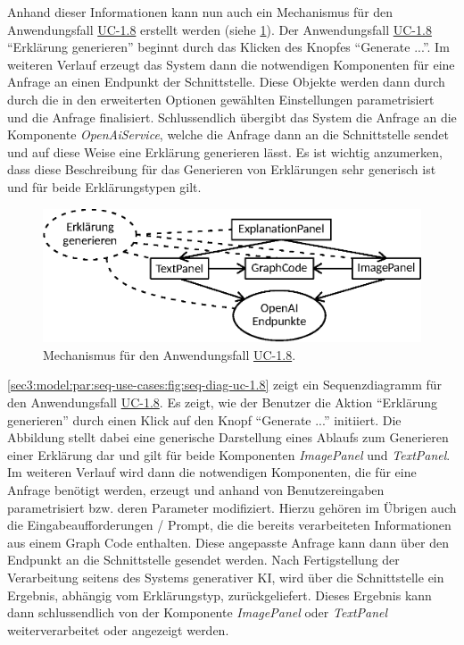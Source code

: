 Anhand dieser Informationen kann nun auch ein Mechanismus für den Anwendungsfall \hyperref[sec3:model:uc-1.8]{UC-1.8} erstellt werden (siehe \cref{sec3:model:par:mechanism-use-cases:fig:mech-uc-1.8}).
Der Anwendungsfall \hyperref[sec3:model:uc-1.8]{UC-1.8} \enquote{Erklärung generieren} beginnt durch das Klicken des Knopfes \enquote{Generate ...}.
Im weiteren Verlauf erzeugt das System dann die notwendigen Komponenten für eine Anfrage an einen Endpunkt der Schnittstelle.
Diese Objekte werden dann durch durch die in den erweiterten Optionen gewählten Einstellungen parametrisiert und die Anfrage finalisiert.
Schlussendlich übergibt das System die Anfrage an die Komponente \textit{OpenAiService}, welche die Anfrage dann an die Schnittstelle sendet und auf diese Weise eine Erklärung generieren lässt.
Es ist wichtig anzumerken, dass diese Beschreibung für das Generieren von Erklärungen sehr generisch ist und für beide Erklärungstypen gilt.

\begin{figure}[htb]
    \centering
    \includegraphics{chapter/chapter_3/mechanisms/mechanism-uc-1.8.eps}
    \caption{Mechanismus für den Anwendungsfall \hyperref[sec3:model:uc-1.8]{UC-1.8}.}
    \label{sec3:model:par:mechanism-use-cases:fig:mech-uc-1.8}
\end{figure}



\cref{sec3:model:par:seq-use-cases:fig:seq-diag-uc-1.8} zeigt ein Sequenzdiagramm für den Anwendungsfall \hyperref[sec3:model:uc-1.8]{UC-1.8}.
Es zeigt, wie der Benutzer die Aktion \enquote{Erklärung generieren} durch einen Klick auf den Knopf \enquote{Generate ...} initiiert.
Die Abbildung stellt dabei eine generische Darstellung eines Ablaufs zum Generieren einer Erklärung dar und gilt für beide Komponenten \textit{ImagePanel} und \textit{TextPanel}.
Im weiteren Verlauf wird dann die notwendigen Komponenten, die für eine Anfrage benötigt werden, erzeugt und anhand von Benutzereingaben parametrisiert bzw. deren Parameter modifiziert.
Hierzu gehören im Übrigen auch die Eingabeaufforderungen / Prompt, die die bereits verarbeiteten Informationen aus einem Graph Code enthalten.
Diese angepasste Anfrage kann dann über den Endpunkt an die Schnittstelle gesendet werden.
Nach Fertigstellung der Verarbeitung seitens des Systems generativer KI, wird über die Schnittstelle ein Ergebnis, abhängig vom Erklärungstyp, zurückgeliefert.
Dieses Ergebnis kann dann schlussendlich von der Komponente \textit{ImagePanel} oder \textit{TextPanel} weiterverarbeitet oder angezeigt werden.

